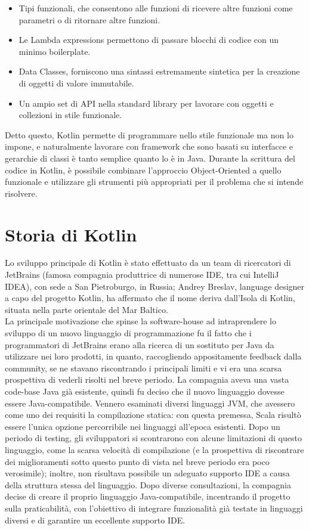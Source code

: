 \begin{itemize}
  \item Tipi funzionali, che consentono alle funzioni di ricevere altre funzioni come parametri o di ritornare altre funzioni.
  \item Le Lambda expressions permettono di passare blocchi di codice con un minimo boilerplate.
  \item Data Classes, forniscono una sintassi estremamente sintetica per la creazione di oggetti di valore immutabile.
  \item Un ampio set di API nella standard library per lavorare con oggetti e collezioni in stile funzionale.
\end{itemize}
Detto questo, Kotlin permette di programmare nello stile funzionale ma non lo impone,
e naturalmente lavorare con framework che sono basati su interfacce e gerarchie di classi
è tanto semplice quanto lo è in Java. Durante la scrittura del codice in Kotlin, è possibile
combinare l'approccio Object-Oriented a quello funzionale e utilizzare gli strumenti più appropriati
per il problema che si intende risolvere.\\

\section{Storia di Kotlin}
Lo sviluppo principale di Kotlin è stato effettuato da un team di ricercatori di JetBrains (famosa compagnia produttrice di numerose IDE, tra cui IntelliJ IDEA), con sede a San Pietroburgo, in Russia; Andrey Breslav, language designer a capo del progetto Kotlin, ha affermato che il nome deriva dall’Isola di Kotlin, situata nella parte orientale del Mar Baltico.\\
La principale motivazione che spinse la software-house ad intraprendere lo sviluppo di un nuovo linguaggio di programmazione fu il fatto che i programmatori di JetBrains erano alla ricerca di un sostituto per Java da utilizzare nei loro prodotti, in quanto, raccogliendo appositamente feedback dalla community, se ne stavano riscontrando i principali limiti e vi era una scarsa prospettiva di vederli risolti nel breve periodo. La compagnia aveva una vasta code-base Java già esistente, quindi fu deciso che il nuovo linguaggio dovesse essere Java-compatibile. Vennero esaminati diversi linguaggi JVM, che avessero come uno dei requisiti la compilazione statica: con questa premessa, Scala risultò essere l'unica opzione percorribile nei linguaggi all'epoca esistenti. Dopo un periodo di testing, gli sviluppatori si scontrarono con alcune limitazioni di questo linguaggio, come la scarsa velocità di compilazione (e la prospettiva di riscontrare dei miglioramenti sotto questo punto di vista nel breve periodo era poco verosimile); inoltre, non risultava possibile un adeguato supporto IDE a causa della struttura stessa del linguaggio. Dopo diverse consultazioni, la compagnia decise di creare il proprio linguaggio Java-compatibile, incentrando il progetto sulla praticabilità, con l’obiettivo di integrare funzionalità già testate in linguaggi diversi e di garantire un eccellente supporto IDE.\\

